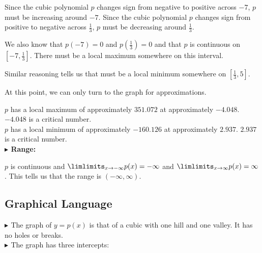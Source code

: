 \documentclass{ximera}
\begin{document}
\begin{exercise}
Since the cubic polynomial $p$ changes sign from negative to positive across $-7$, $p$ must be increasing around $-7$. Since the cubic polynomial $p$ changes sign from positive to negative across $\frac{1}{3}$, $p$ must be decreasing around $\frac{1}{3}$. 


We also know that $p(-7) = 0$ and $p\left( \frac{1}{3} \right) = 0$ and that $p$ is continuous on $\left[-7, \frac{1}{3}  \right]$.  There must be a local maximum somewhere on this interval.


Similar reasoning tells us that must be a local minimum somewhere on $\left[ \frac{1}{3}, 5 \right]$.





At this point, we can only turn to the graph for approximations.



$p$ has a local maximum of approximately $351.072$ at approximately $-4.048$.  $-4.048$ is a critical number. \\





$p$ has a local minimum of approximately $-160.126$ at approximately $2.937$.  $2.937$ is a critical number. \\









\textbf{\textcolor{blue!55!black}{$\blacktriangleright$ Range: }}


$p$ is continuous and  $\limlimits_{x \to -\infty} p(x) = -\infty$  and $\limlimits_{x \to \infty} p(x) = \infty$.  This tells us that the range is $(-\infty, \infty)$.








\subsection{Graphical Language}







\textbf{\textcolor{blue!55!black}{$\blacktriangleright$ }}  The graph of $y = p(x)$ is that of a cubic with one hill and one valley. It has no holes or breaks. \\

\textbf{\textcolor{blue!55!black}{$\blacktriangleright$ }}  The graph has three intercepts:



\end{exercise}
\end{document}
